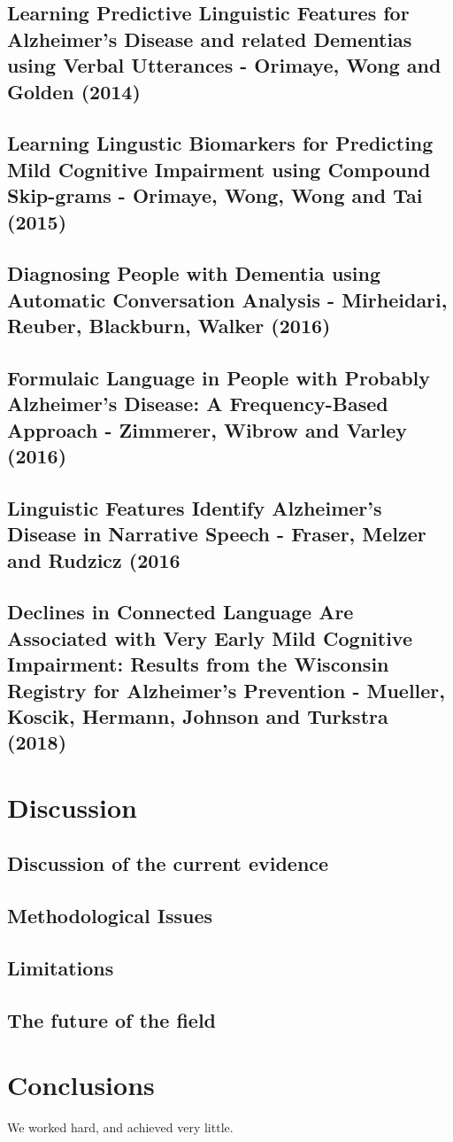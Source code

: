 \documentclass[12pt]{article}
\begin{document}
\subsection{Learning Predictive Linguistic Features for Alzheimer's Disease and related Dementias using Verbal Utterances - Orimaye, Wong and Golden (2014)}

\subsection{Learning Lingustic Biomarkers for Predicting Mild Cognitive Impairment using Compound Skip-grams - Orimaye, Wong, Wong and Tai (2015)}

\subsection{Diagnosing People with Dementia using Automatic Conversation Analysis - Mirheidari, Reuber, Blackburn, Walker (2016)}

\subsection{Formulaic Language in People with Probably Alzheimer's Disease: A Frequency-Based Approach - Zimmerer, Wibrow and Varley (2016)}

\subsection{Linguistic Features Identify Alzheimer's Disease in Narrative Speech - Fraser, Melzer and Rudzicz (2016}

\subsection{Declines in Connected Language Are Associated with Very Early Mild Cognitive Impairment: Results from the Wisconsin Registry for Alzheimer's Prevention - Mueller, Koscik, Hermann, Johnson and Turkstra (2018)}



\section{Discussion}\label{discussion}
\subsection{Discussion of the current evidence}
\subsection{Methodological Issues}
\subsection{Limitations}
\subsection{The future of the field}

\section{Conclusions}\label{conclusions}
We worked hard, and achieved very little.





\end{document}

